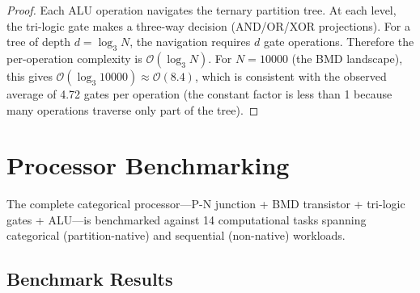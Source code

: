\documentclass[twocolumn,10pt,a4paper]{article}
\theoremstyle{definition}
\theoremstyle{remark}
\begin{document}
\begin{proof}
Each ALU operation navigates the ternary partition tree. At each level, the tri-logic gate makes a three-way decision (AND/OR/XOR projections). For a tree of depth $d = \log_3 N$, the navigation requires $d$ gate operations. Therefore the per-operation complexity is $\mathcal{O}(\log_3 N)$. For $N = 10000$ (the BMD landscape), this gives $\mathcal{O}(\log_3 10000) \approx \mathcal{O}(8.4)$, which is consistent with the observed average of 4.72 gates per operation (the constant factor is less than 1 because many operations traverse only part of the tree). \qedhere
\end{proof}


\section{Processor Benchmarking}
\label{sec:processor}

The complete categorical processor---P-N junction + BMD transistor + tri-logic gates + ALU---is benchmarked against 14 computational tasks spanning categorical (partition-native) and sequential (non-native) workloads.

\subsection{Benchmark Results}
\end{document}

